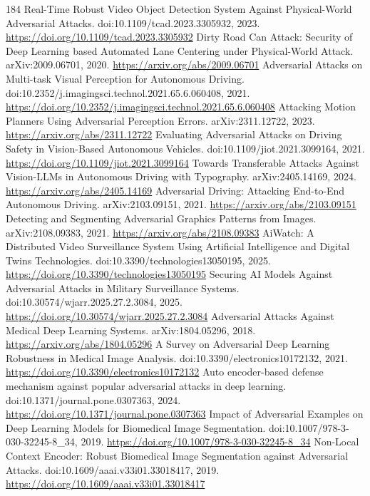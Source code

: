 \documentclass[11pt]{article}
\begin{document}
\begin{thebibliography}{184}
 Real-Time Robust Video Object Detection System Against Physical-World Adversarial Attacks. doi:10.1109/tcad.2023.3305932, 2023. \url{https://doi.org/10.1109/tcad.2023.3305932}
 Dirty Road Can Attack: Security of Deep Learning based Automated Lane Centering under Physical-World Attack. arXiv:2009.06701, 2020. \url{https://arxiv.org/abs/2009.06701}
 Adversarial Attacks on Multi-task Visual Perception for Autonomous Driving. doi:10.2352/j.imagingsci.technol.2021.65.6.060408, 2021. \url{https://doi.org/10.2352/j.imagingsci.technol.2021.65.6.060408}
 Attacking Motion Planners Using Adversarial Perception Errors. arXiv:2311.12722, 2023. \url{https://arxiv.org/abs/2311.12722}
 Evaluating Adversarial Attacks on Driving Safety in Vision-Based Autonomous Vehicles. doi:10.1109/jiot.2021.3099164, 2021. \url{https://doi.org/10.1109/jiot.2021.3099164}
 Towards Transferable Attacks Against Vision-LLMs in Autonomous Driving with Typography. arXiv:2405.14169, 2024. \url{https://arxiv.org/abs/2405.14169}
 Adversarial Driving: Attacking End-to-End Autonomous Driving. arXiv:2103.09151, 2021. \url{https://arxiv.org/abs/2103.09151}
 Detecting and Segmenting Adversarial Graphics Patterns from Images. arXiv:2108.09383, 2021. \url{https://arxiv.org/abs/2108.09383}
 AiWatch: A Distributed Video Surveillance System Using Artificial Intelligence and Digital Twins Technologies. doi:10.3390/technologies13050195, 2025. \url{https://doi.org/10.3390/technologies13050195}
 Securing AI Models Against Adversarial Attacks in Military Surveillance Systems. doi:10.30574/wjarr.2025.27.2.3084, 2025. \url{https://doi.org/10.30574/wjarr.2025.27.2.3084}
 Adversarial Attacks Against Medical Deep Learning Systems. arXiv:1804.05296, 2018. \url{https://arxiv.org/abs/1804.05296}
 A Survey on Adversarial Deep Learning Robustness in Medical Image Analysis. doi:10.3390/electronics10172132, 2021. \url{https://doi.org/10.3390/electronics10172132}
 Auto encoder-based defense mechanism against popular adversarial attacks in deep learning. doi:10.1371/journal.pone.0307363, 2024. \url{https://doi.org/10.1371/journal.pone.0307363}
 Impact of Adversarial Examples on Deep Learning Models for Biomedical Image Segmentation. doi:10.1007/978-3-030-32245-8\_34, 2019. \url{https://doi.org/10.1007/978-3-030-32245-8_34}
 Non-Local Context Encoder: Robust Biomedical Image Segmentation against Adversarial Attacks. doi:10.1609/aaai.v33i01.33018417, 2019. \url{https://doi.org/10.1609/aaai.v33i01.33018417}

\end{thebibliography}
\end{document}
